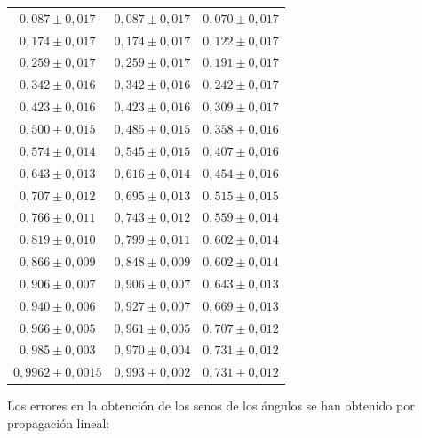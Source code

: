 \documentclass[a4paper,twocolumn]{article}
\begin{document}
\begin{table}[!ht]
{\begin{tabular}{ccc}
        				$0,087 \pm 0,017$   & $0,087 \pm 0,017$     & $0,070 \pm 0,017$ \\
        				$0,174 \pm 0,017$  & $0,174 \pm 0,017$     & $0,122 \pm 0,017$ \\
        				$0,259 \pm 0,017$  & $0,259 \pm 0,017$     & $0,191 \pm 0,017$ \\
        				$0,342 \pm 0,016$  & $0,342 \pm 0,016$     & $0,242 \pm 0,017$ \\
        				$0,423 \pm 0,016$  & $0,423 \pm 0,016$     & $0,309 \pm 0,017$ \\
        				$0,500 \pm 0,015$  & $0,485 \pm 0,015$     & $0,358 \pm 0,016$ \\
        				$0,574 \pm 0,014$  & $0,545 \pm 0,015$     & $0,407 \pm 0,016$ \\
        				$0,643 \pm 0,013$  & $0,616 \pm 0,014$     & $0,454 \pm 0,016$ \\
        				$0,707 \pm 0,012$  & $0,695 \pm 0,013$     & $0,515 \pm 0,015$ \\
        				$0,766 \pm 0,011$  & $0,743 \pm 0,012$     & $0,559 \pm 0,014$ \\
        				$0,819 \pm 0,010$  & $0,799 \pm 0,011$     & $0,602 \pm 0,014$ \\
        				$0,866 \pm 0,009$  & $0,848 \pm 0,009$     & $0,602 \pm 0,014$ \\
        				$0,906 \pm 0,007$  & $0,906 \pm 0,007$     & $0,643 \pm 0,013$ \\
        				$0,940 \pm 0,006$  & $0,927 \pm 0,007$     & $0,669 \pm 0,013$ \\
        				$0,966 \pm 0,005$  & $0,961 \pm 0,005$     & $0,707 \pm 0,012$ \\
        				$0,985 \pm 0,003$  & $0,970 \pm 0,004$     & $0,731 \pm 0,012$ \\
        				$0,9962 \pm 0,0015$  & $0,993 \pm 0,002$     & $0,731 \pm 0,012$ \\
        				
        				\bottomrule 
        				
        			\end{tabular}
        			
        		}
        		
        		\label{tab:SenAngAirAgu}
        	\end{table}

            Los errores en la obtención de los senos de los ángulos se han obtenido por propagación lineal:
            
\end{document}
